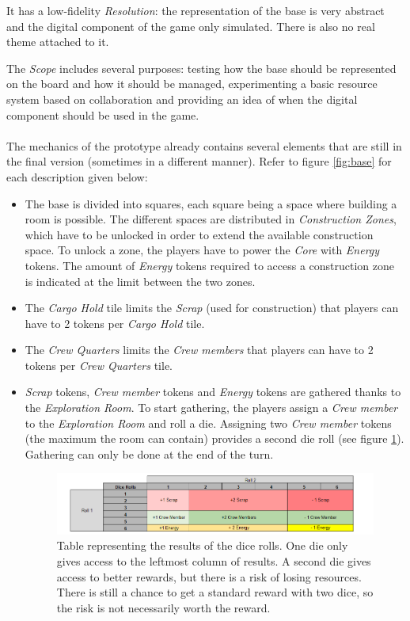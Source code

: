It has a low-fidelity \textit{Resolution}: the representation of the base is very abstract and the digital component of the game only simulated. There is also no real theme attached to it. 

The \textit{Scope} includes several purposes: testing how the base should be represented on the board and how it should be managed, experimenting a basic resource system based on collaboration and providing an idea of when the digital component should be used in the game.\\\\
The mechanics of the prototype already contains several elements that are still in the final version (sometimes in a different manner). Refer to figure \ref{fig:base} for each description given below:
\begin{itemize}
\item The base is divided into squares, each square being a space where building a room is possible. The different spaces are distributed in \textit{Construction Zones}, which have to be unlocked in order to extend the available construction space. To unlock a zone, the players have to power the \textit{Core} with \textit{Energy} tokens. The amount of \textit{Energy} tokens required to access a construction zone is indicated at the limit between the two zones.
\item The \textit{Cargo Hold} tile limits the \textit{Scrap} (used for construction) that players can have to 2 tokens per \textit{Cargo Hold} tile.
\item The \textit{Crew Quarters} limits the \textit{Crew members} that players can have to 2 tokens per \textit{Crew Quarters} tile.
\item \textit{Scrap} tokens, \textit{Crew member} tokens and \textit{Energy} tokens are gathered thanks to the \textit{Exploration Room}. To start gathering, the players assign a \textit{Crew member} to the \textit{Exploration Room} and roll a die. Assigning two \textit{Crew member} tokens (the maximum the room can contain) provides a second die roll (see figure \ref{fig:Dicetable}). Gathering can only be done at the end of the turn.
\begin{figure}[h]
    \centering
    \includegraphics[scale=0.6]{Images/DiceProto1.png}
    \caption{Table representing the results of the dice rolls. One die only gives access to the leftmost column of results. A second die gives access to better rewards, but there is a risk of losing resources. There is still a chance to get a standard reward with two dice, so the risk is not necessarily worth the reward.}
    \label{fig:Dicetable}
\end{figure}
\end{itemize}
